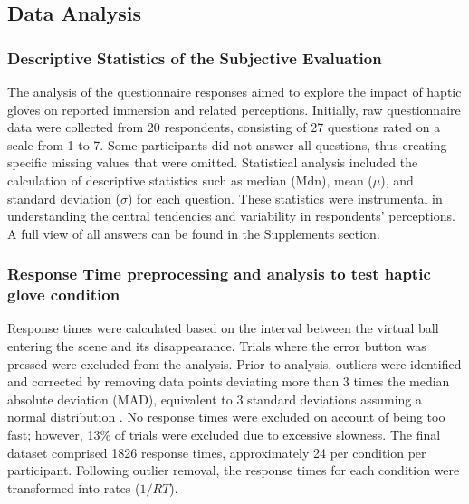 \documentclass[12pt,oneside,openright]{report}
\begin{document}
\subsection*{Data Analysis}

\subsubsection*{Descriptive Statistics of the Subjective Evaluation}
The analysis of the questionnaire responses aimed to explore the impact of haptic gloves on reported immersion and related perceptions. Initially, raw questionnaire data were collected from 20 respondents, consisting of 27 questions rated on a scale from 1 to 7. Some participants did not answer all questions, thus creating specific missing values that were omitted. Statistical analysis included the calculation of descriptive statistics such as median ($\text{Mdn}$), mean ($\mu$), and standard deviation ($\sigma$) for each question. These statistics were instrumental in understanding the central tendencies and variability in respondents' perceptions. A full view of all answers can be found in the Supplements section.

\subsubsection*{Response Time preprocessing and analysis to test haptic glove condition}

Response times were calculated based on the interval between the virtual ball entering the scene and its disappearance. Trials where the error button was pressed were excluded from the analysis. Prior to analysis, outliers were identified and corrected by removing data points deviating more than 3 times the median absolute deviation (MAD), equivalent to 3 standard deviations assuming a normal distribution \parencite{Innes2019ACA}. No response times were excluded on account of being too fast; however, 13\% of trials were excluded due to excessive slowness. The final dataset comprised 1826 response times, approximately 24 per condition per participant. Following outlier removal, the response times for each condition were transformed into rates ($1/RT$).
\end{document}
